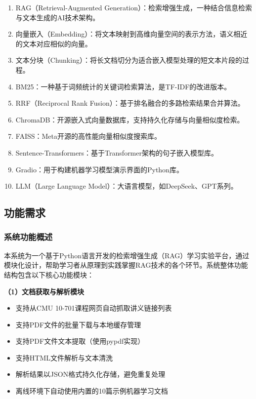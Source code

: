 \documentclass[10pt,a4paper]{article}
\begin{document}
\begin{enumerate}[label=(\arabic*)]
\item RAG（Retrieval-Augmented Generation）：检索增强生成，一种结合信息检索与文本生成的AI技术架构。
\item 向量嵌入（Embedding）：将文本映射到高维向量空间的表示方法，语义相近的文本对应相似的向量。
\item 文本分块（Chunking）：将长文档切分为适合嵌入模型处理的短文本片段的过程。
\item BM25：一种基于词频统计的关键词检索算法，是TF-IDF的改进版本。
\item RRF（Reciprocal Rank Fusion）：基于排名融合的多路检索结果合并算法。
\item ChromaDB：开源嵌入式向量数据库，支持持久化存储与向量相似度检索。
\item FAISS：Meta开源的高性能向量相似度搜索库。
\item Sentence-Transformers：基于Transformer架构的句子嵌入模型库。
\item Gradio：用于构建机器学习模型演示界面的Python库。
\item LLM（Large Language Model）：大语言模型，如DeepSeek、GPT系列。
\end{enumerate}

\subsection{功能需求}

\subsubsection{系统功能概述}

本系统为一个基于Python语言开发的检索增强生成（RAG）学习实验平台，通过模块化设计，帮助学习者从原理到实践掌握RAG技术的各个环节。系统整体功能结构包含以下核心功能模块：

\textbf{（1）文档获取与解析模块}
\begin{itemize}
\item 支持从CMU 10-701课程网页自动抓取讲义链接列表
\item 支持PDF文件的批量下载与本地缓存管理
\item 支持PDF文件文本提取（使用pypdf实现）
\item 支持HTML文件解析与文本清洗
\item 解析结果以JSON格式持久化存储，避免重复处理
\item 离线环境下自动使用内置的10篇示例机器学习文档
\end{itemize}
\end{document}
